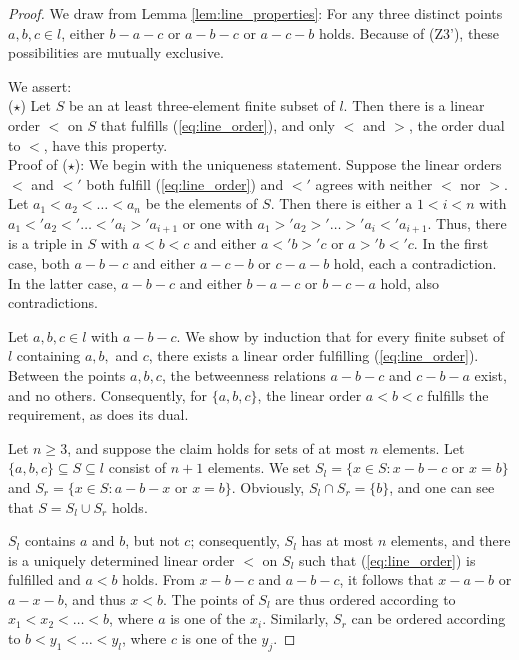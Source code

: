 \documentclass[11pt,a4paper]{article}
\newcommand{\betw}[3]{#1 - #2 - #3}
\begin{document}
\begin{proof}
We draw from Lemma \ref{lem:line_properties}: For any three distinct points $a, b, c \in l$, either $\betw{b}{a}{c}$ or $\betw{a}{b}{c}$ or $\betw{a}{c}{b}$ holds. Because of (Z3'), these possibilities are mutually exclusive.

We assert: \\
($\star$) Let $S$ be an at least three-element finite subset of $l$. Then there is a linear order $<$ on $S$ that fulfills (\ref{eq:line_order}), and only $<$ and $>$, the order dual to $<$, have this property. \\
Proof of ($\star$): We begin with the uniqueness statement. Suppose the linear orders $<$ and $<'$ both fulfill (\ref{eq:line_order}) and $<'$ agrees with neither $<$ nor $>$. Let $a_1 < a_2 < \dots < a_n$ be the elements of $S$. Then there is either a $1 < i < n$ with $a_1 <' a_2 <' \dots <' a_i >' a_{i+1}$ or one with $a_1 >' a_2 >' \dots >' a_i <' a_{i+1}$. Thus, there is a triple in $S$ with $a < b < c$ and either $a <' b >' c$ or $a >' b <' c$. In the first case, both $\betw{a}{b}{c}$ and either $\betw{a}{c}{b}$ or $\betw{c}{a}{b}$ hold, each a contradiction. In the latter case, $\betw{a}{b}{c}$ and either $\betw{b}{a}{c}$ or $\betw{b}{c}{a}$ hold, also contradictions.

Let $a, b, c \in l$ with $\betw{a}{b}{c}$. We show by induction that for every finite subset of $l$ containing $a, b,$ and $c$, there exists a linear order fulfilling (\ref{eq:line_order}). Between the points $a, b, c$, the betweenness relations $\betw{a}{b}{c}$ and $\betw{c}{b}{a}$ exist, and no others. Consequently, for $\{a, b, c\}$, the linear order $a < b < c$ fulfills the requirement, as does its dual.

Let $n \ge 3$, and suppose the claim holds for sets of at most $n$ elements. Let $\{a, b, c\} \subseteq S \subseteq l$ consist of $n+1$ elements. We set $S_l = \{x \in S : \betw{x}{b}{c} \text{ or } x = b\}$ and $S_r = \{x \in S : \betw{a}{b}{x} \text{ or } x = b\}$. Obviously, $S_l \cap S_r = \{b\}$, and one can see that $S = S_l \cup S_r$ holds.

$S_l$ contains $a$ and $b$, but not $c$; consequently, $S_l$ has at most $n$ elements, and there is a uniquely determined linear order $<$ on $S_l$ such that (\ref{eq:line_order}) is fulfilled and $a < b$ holds. From $\betw{x}{b}{c}$ and $\betw{a}{b}{c}$, it follows that $\betw{x}{a}{b}$ or $\betw{a}{x}{b}$, and thus $x < b$. The points of $S_l$ are thus ordered according to $x_1 < x_2 < \dots < b$, where $a$ is one of the $x_i$. Similarly, $S_r$ can be ordered according to $b < y_1 < \dots < y_l$, where $c$ is one of the $y_j$.


\end{proof}
\end{document}
